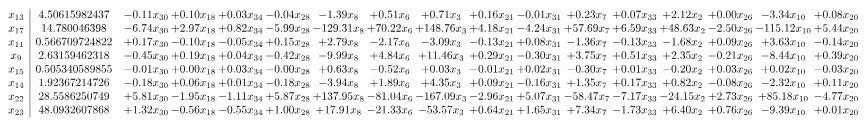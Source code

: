 \documentclass[9pt]{article}
\begin{document}
 \[\begin{array}{c| c c@{\hskip 2pt} c@{\hskip 2pt} c@{\hskip 2pt} c@{\hskip 2pt} c@{\hskip 2pt} c@{\hskip 2pt} c@{\hskip 2pt} c@{\hskip 2pt} c@{\hskip 2pt} c@{\hskip 2pt} c@{\hskip 2pt} c@{\hskip 2pt} c@{\hskip 2pt} c@{\hskip 2pt} c@{\hskip 2pt} }
 x_{13}   &  4.50615982437 & -0.11 x_{30} & +  0.10 x_{18} & +  0.03 x_{34} & -0.04 x_{28} & -1.39 x_{8} & +  0.51 x_{6} & +  0.71 x_{3} & +  0.16 x_{21} & -0.01 x_{31} & +  0.23 x_{7} & +  0.07 x_{33} & +  2.12 x_{2} & +  0.00 x_{26} & -3.34 x_{10} & +  0.08 x_{20}\\
 x_{17}   &  14.780046398 & -6.74 x_{30} & +  2.97 x_{18} & +  0.82 x_{34} & -5.99 x_{28} & -129.31 x_{8} & + 70.22 x_{6} & + 148.76 x_{3} & +  4.18 x_{21} & -4.24 x_{31} & + 57.69 x_{7} & +  6.59 x_{33} & + 48.63 x_{2} & -2.50 x_{26} & -115.12 x_{10} & +  5.44 x_{20}\\
 x_{11}   &  0.566709724822 & +  0.17 x_{30} & -0.10 x_{18} & -0.05 x_{34} & +  0.15 x_{28} & +  2.79 x_{8} & -2.17 x_{6} & -3.09 x_{3} & -0.13 x_{21} & +  0.08 x_{31} & -1.36 x_{7} & -0.13 x_{33} & -1.68 x_{2} & +  0.09 x_{26} & +  3.63 x_{10} & -0.14 x_{20}\\
 x_{9}   &  2.63159462318 & -0.45 x_{30} & +  0.19 x_{18} & +  0.04 x_{34} & -0.42 x_{28} & -9.99 x_{8} & +  4.84 x_{6} & + 11.46 x_{3} & +  0.29 x_{21} & -0.30 x_{31} & +  3.75 x_{7} & +  0.51 x_{33} & +  2.35 x_{2} & -0.21 x_{26} & -8.44 x_{10} & +  0.39 x_{20}\\
 x_{15}   &  0.505340589855 & -0.01 x_{30} & +  0.00 x_{18} & +  0.03 x_{34} & -0.00 x_{28} & +  0.63 x_{8} & -0.52 x_{6} & +  0.03 x_{3} & -0.01 x_{21} & +  0.02 x_{31} & -0.30 x_{7} & +  0.01 x_{33} & -0.20 x_{2} & +  0.03 x_{26} & +  0.02 x_{10} & -0.03 x_{20}\\
 x_{14}   &  1.92367214726 & -0.18 x_{30} & +  0.06 x_{18} & +  0.01 x_{34} & -0.18 x_{28} & -3.94 x_{8} & +  1.89 x_{6} & +  4.35 x_{3} & +  0.09 x_{21} & -0.16 x_{31} & +  1.35 x_{7} & +  0.17 x_{33} & +  0.82 x_{2} & -0.08 x_{26} & -2.32 x_{10} & +  0.11 x_{20}\\
 x_{22}   &  28.5586250749 & +  5.81 x_{30} & -1.95 x_{18} & -1.11 x_{34} & +  5.87 x_{28} & + 137.95 x_{8} & -81.04 x_{6} & -167.09 x_{3} & -2.96 x_{21} & +  5.07 x_{31} & -58.47 x_{7} & -7.17 x_{33} & -24.15 x_{2} & +  2.73 x_{26} & + 85.18 x_{10} & -4.77 x_{20}\\
 x_{23}   &  48.0932607868 & +  1.32 x_{30} & -0.56 x_{18} & -0.55 x_{34} & +  1.00 x_{28} & + 17.91 x_{8} & -21.33 x_{6} & -53.57 x_{3} & +  0.64 x_{21} & +  1.65 x_{31} & +  7.34 x_{7} & -1.73 x_{33} & +  6.40 x_{2} & +  0.76 x_{26} & -9.39 x_{10} & +  0.01 x_{20}\\

\end{array}\]
\end{document}
